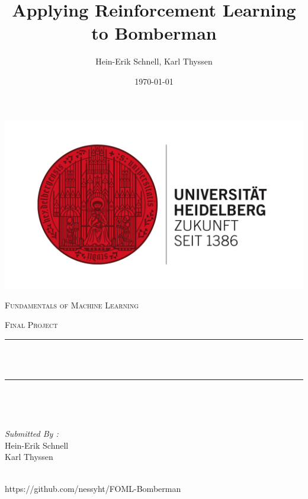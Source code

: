 \documentclass[12pt]{report}
\title{Applying Reinforcement Learning to Bomberman}
\author{Hein-Erik Schnell, Karl Thyssen}
\date{\today}
\makeatletter
\let\thetitle\@title
\newcommand{\code}[1]{{\fontfamily{pcr}\selectfont #1}}
\makeatother
\begin{document}

\begin{titlepage}
	\centering
    \vspace*{0.5 cm}
    \includegraphics[scale = 0.075]{uni_hd_logo.jpg}\\[1.0 cm]	%
\begin{center}    \textsc{\Large   Fundamentals of Machine Learning}\\[2.0 cm]	\end{center}%
	\textsc{\Large Final Project  }\\[0.5 cm]				%
	\rule{\linewidth}{0.2 mm} \\[0.4 cm]
	{ \huge \bfseries \thetitle}\\
	\rule{\linewidth}{0.2 mm} \\[1.5 cm]
	
	\begin{minipage}{0.4\textwidth}
		\begin{flushleft} \large
			\end{flushleft}
			\end{minipage}~
			\begin{minipage}{0.4\textwidth}
            
			\begin{flushright} \large
			\emph{Submitted By :} \\
			Hein-Erik Schnell\\
			Karl Thyssen  
		\end{flushright}
           
	\end{minipage}\\[2 cm]
	
    
    \code{https://github.com/nessyht/FOML-Bomberman}
    
\end{titlepage}
\end{document}
